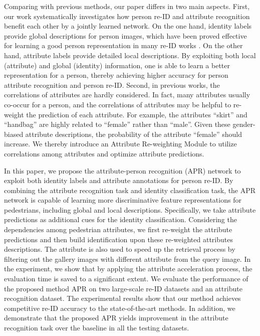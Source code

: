 \documentclass[5p,times,twocolumn]{elsarticle}
\begin{document}
Comparing with previous methods, our paper differs in two main aspects. First, our work systematically investigates how person re-ID and attribute recognition benefit each other by a jointly learned network. On the one hand, identity labels provide global descriptions for person images, which have been proved effective for learning a good person representation in many re-ID works \cite{Zheng_2015_ICCV,chen2016deep,wu2018cvpr_oneshot}. On the other hand, attribute labels provide detailed local descriptions. By exploiting both local (attribute) and global (identity) information, one is able to learn a better representation for a person, thereby achieving higher accuracy for person attribute recognition and person re-ID. Second, in previous works, the correlations of attributes are hardly considered. In fact, many attributes usually co-occur for a person, and the correlations of attributes may be helpful to re-weight the prediction of each attribute. For example, the attributes ``skirt” and ``handbag” are highly related to ``female” rather than ``male”. Given these gender-biased attribute descriptions, the probability of the attribute ``female” should increase. We thereby introduce an Attribute Re-weighting Module to utilize correlations among attributes and optimize attribute predictions.

In this paper, we propose the attribute-person recognition (APR) network to exploit both identity labels and attribute annotations for person re-ID.
By combining the attribute recognition task and identity classification task, the APR network is capable of learning more discriminative feature representations for pedestrians, including global and local descriptions.
Specifically, we take attribute predictions as additional cues for the identity classification.
Considering the dependencies among pedestrian attributes, we first re-weight the attribute predictions and then build identification upon these re-weighted attributes descriptions. 
The attribute is also used to speed up the retrieval process by filtering out the gallery images with different attribute from the query image. In the experiment, we show that by applying the attribute acceleration process, the evaluation time is saved to a significant extent.
We evaluate the performance of the proposed method APR on two large-scale re-ID datasets and an attribute recognition dataset. The experimental results show that our method achieves competitive re-ID accuracy to the state-of-the-art methods. 
In addition, we demonstrate that the proposed APR yields improvement in the attribute recognition task over the baseline in all the testing datasets.
\end{document}
